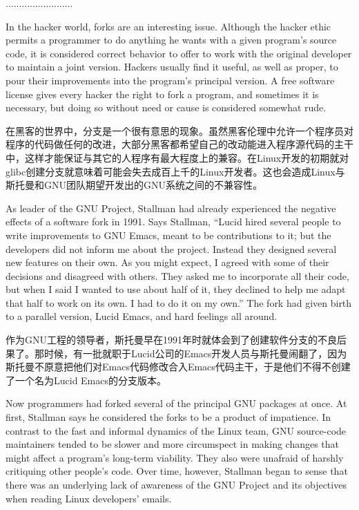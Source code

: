 \ifdefined\chs
.........................
\fi

\ifdefined\eng
In the hacker world, forks are an interesting issue. Although the hacker ethic permits a programmer to do anything he wants with a given program's source code, it is considered correct behavior to offer to work with the original developer to maintain a joint version.  Hackers usually find it useful, as well as proper, to pour their improvements into the program's principal version.  A free software license gives every hacker the right to fork a program, and sometimes it is necessary, but doing so without need or cause is considered somewhat rude.
\fi

\ifdefined\chs
在黑客的世界中，分支是一个很有意思的现象。虽然黑客伦理中允许一个程序员对程序的代码做任何的改进，大部分黑客都希望自己的改动能进入程序源代码的主干中，这样才能保证与其它的人程序有最大程度上的兼容。在Linux开发的初期就对glibc创建分支就意味着可能会失去成百上千的Linux开发者。这也会造成Linux与斯托曼和GNU团队期望开发出的GNU系统之间的不兼容性。
\fi

\ifdefined\eng
As leader of the GNU Project, Stallman had already experienced the negative effects of a software fork in 1991. Says Stallman, ``Lucid hired several people to write improvements to GNU Emacs, meant to be contributions to it; but the developers did not inform me about the project.  Instead they designed several new features on their own.  As you might expect, I agreed with some of their decisions and disagreed with others.  They asked me to incorporate all their code, but when I said I wanted to use about half of it, they declined to help me adapt that half to work on its own.  I had to do it on my own.'' The fork had given birth to a parallel version, Lucid Emacs, and hard feelings all around.
\fi

\ifdefined\chs
作为GNU工程的领导者，斯托曼早在1991年时就体会到了创建软件分支的不良后果了。那时候，有一批就职于Lucid公司的Emacs开发人员与斯托曼闹翻了，因为斯托曼不原意把他们对Emacs代码修改合入Emacs代码主干，于是他们不得不创建了一个名为Lucid Emacs的分支版本。
\fi

\ifdefined\eng
Now programmers had forked several of the principal GNU packages at once. At first, Stallman says he considered the forks to be a product of impatience. In contrast to the fast and informal dynamics of the Linux team, GNU source-code maintainers tended to be slower and more circumspect in making changes that might affect a program's long-term viability. They also were unafraid of harshly critiquing other people's code. Over time, however, Stallman began to sense that there was an underlying lack of awareness of the GNU Project and its objectives when reading Linux developers' emails.
\fi


